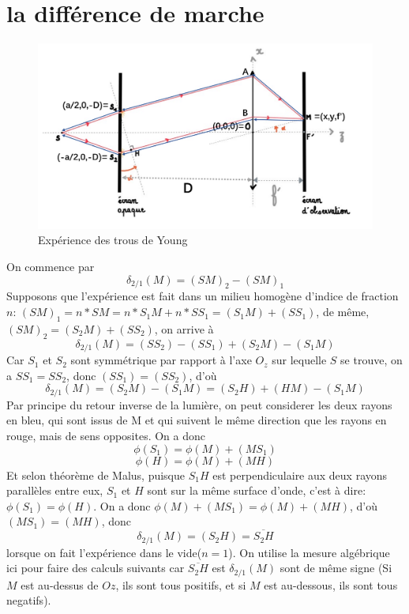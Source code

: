 \documentclass[a4paper,12pt]{book}
\begin{document}
\renewcommand{\labelitemi}{$\blacktriangleright$}
\renewcommand{\labelitemii}{$\bullet$}


\section{la différence de marche}
\begin{figure}[h]
    \begin{center}
    \includegraphics[scale=0.7]{tr4.png}
    \end{center}
    \caption{Expérience des trous de Young}
\end{figure}
On commence par $$\delta_{2/1}(M)=(SM)_2-(SM)_1$$
Supposons que l'expérience est fait dans un milieu homogène d'indice de fraction $n$: 
$(SM)_1=n*SM=n*S_1M+n*SS_1=(S_1M)+(SS_1)$, de même, $(SM)_2=(S_2M)+(SS_2)$, on arrive à 
$$\delta_{2/1}(M)=(SS_2)-(SS_1) + (S_2M)-(S_1M) $$
Car $S_1$ et $S_2$ sont symmétrique par rapport à l'axe $O_z$ sur lequelle $S$ se trouve, 
on a $SS_1=SS_2$, donc $(SS_1)=(SS_2)$, d'où
$$\delta_{2/1}(M)=(S_2M) - (S_1M)=(S_2H)+(HM)-(S_1M)$$
Par principe du retour inverse de la lumière, on peut considerer les deux rayons en bleu, 
qui sont issus de M et qui suivent le même direction que les rayons en rouge, mais de sens opposites. 
On a donc 
$$
\phi(S_1)=\phi(M)+(MS_1)
$$
$$
\phi(H)=\phi(M)+(MH)
$$
Et selon théorème de Malus, puisque $S_1H$ est perpendiculaire aux deux rayons parallèles entre eux, 
$S_1$ et $H$ sont sur la même surface d'onde, c'est à dire: $\phi(S_1)=\phi(H)$. 
On a donc $\phi(M)+(MS_1)=\phi(M)+(MH)$, d'où $(MS_1)=(MH)$, donc 
$$
\delta_{2/1}(M)=(S_2H)=\overline{S_2H}
$$
lorsque on fait l’expérience dans le vide($n=1$). On utilise la mesure algébrique ici pour faire des calculs suivants car 
$\overline{S_2H}$ est $\delta_{2/1}(M)$ sont de même signe (Si $M$ est au-dessus de $Oz$, ils sont tous positifs, 
et si $M$ est au-dessous, ils sont tous negatifs).
\end{document}
